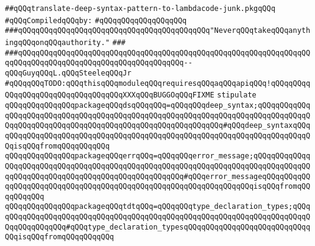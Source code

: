 \label{src/lib/compiler/back/top/translate/translate-deep-syntax-pattern-to-lambdacode-junk.pkg}
\verb|##qQQqtranslate-deep-syntax-pattern-to-lambdacode-junk.pkgqQQq|\newline
\newline
\verb|#qQQqCompiledqQQqby:|\newline
\verb|#qQQqqQQqqQQqqQQqqQQq|\newline
\newline
\newline
\newline
\verb|###qQQqqQQqqQQqqQQqqQQqqQQqqQQqqQQqqQQqqQQqqQQq"NeverqQQqtakeqQQqanythingqQQqonqQQqauthority."|\newline
\verb|###|\newline
\verb|###qQQqqQQqqQQqqQQqqQQqqQQqqQQqqQQqqQQqqQQqqQQqqQQqqQQqqQQqqQQqqQQqqQQqqQQqqQQqqQQqqQQqqQQqqQQqqQQqqQQqqQQqqQQq--qQQqGuyqQQqL.qQQqSteeleqQQqJr|\newline
\newline
\newline
\newline
\verb|#qQQqqQQqTODO:qQQqthisqQQqmoduleqQQqrequiresqQQqaqQQqapiqQQq!qQQqqQQqqQQqqQQqqQQqqQQqqQQqqQQqqQQqXXXqQQqBUGGOqQQqFIXME|\newline
\newline
\verb|stipulate|\newline
\verb|qQQqqQQqqQQqqQQqpackageqQQqdsqQQqqQQq=qQQqqQQqdeep_syntax;qQQqqQQqqQQqqQQqqQQqqQQqqQQqqQQqqQQqqQQqqQQqqQQqqQQqqQQqqQQqqQQqqQQqqQQqqQQqqQQqqQQqqQQqqQQqqQQqqQQqqQQqqQQqqQQqqQQqqQQqqQQqqQQqqQQq#qQQqdeep_syntaxqQQqqQQqqQQqqQQqqQQqqQQqqQQqqQQqqQQqqQQqqQQqqQQqqQQqqQQqqQQqqQQqqQQqqQQqqQQqisqQQqfromqQQqqQQqqQQq|\newline
\verb|qQQqqQQqqQQqqQQqpackageqQQqerrqQQq=qQQqqQQqerror_message;qQQqqQQqqQQqqQQqqQQqqQQqqQQqqQQqqQQqqQQqqQQqqQQqqQQqqQQqqQQqqQQqqQQqqQQqqQQqqQQqqQQqqQQqqQQqqQQqqQQqqQQqqQQqqQQqqQQqqQQqqQQq#qQQqerror_messageqQQqqQQqqQQqqQQqqQQqqQQqqQQqqQQqqQQqqQQqqQQqqQQqqQQqqQQqqQQqqQQqqQQqisqQQqfromqQQqqQQqqQQq|\newline
\verb|qQQqqQQqqQQqqQQqpackageqQQqtdtqQQq=qQQqqQQqtype_declaration_types;qQQqqQQqqQQqqQQqqQQqqQQqqQQqqQQqqQQqqQQqqQQqqQQqqQQqqQQqqQQqqQQqqQQqqQQqqQQqqQQqqQQqqQQq#qQQqtype_declaration_typesqQQqqQQqqQQqqQQqqQQqqQQqqQQqqQQqisqQQqfromqQQqqQQqqQQq|\newline
